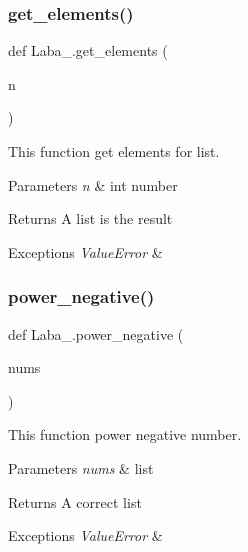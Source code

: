 \subsubsection{\texorpdfstring{get\+\_\+elements()}{get\_elements()}}
{\footnotesize\ttfamily def Laba\+\_.\+get\+\_\+elements (\begin{DoxyParamCaption}\item[{}]{n }\end{DoxyParamCaption})}



This function get elements for list. 


\begin{DoxyParams}{Parameters}
{\em n} & int number \\
\hline
\end{DoxyParams}
\begin{DoxyReturn}{Returns}
A list is the result
\end{DoxyReturn}

\begin{DoxyExceptions}{Exceptions}
{\em Value\+Error} & \\
\hline
\end{DoxyExceptions}
\mbox{\label{namespace_laba__3_abe3ae253298c87454a72df4f5faea91a}} 
\subsubsection{\texorpdfstring{power\+\_\+negative()}{power\_negative()}}
{\footnotesize\ttfamily def Laba\+\_.\+power\+\_\+negative (\begin{DoxyParamCaption}\item[{}]{nums }\end{DoxyParamCaption})}



This function power negative number. 


\begin{DoxyParams}{Parameters}
{\em nums} & list \\
\hline
\end{DoxyParams}
\begin{DoxyReturn}{Returns}
A correct list
\end{DoxyReturn}

\begin{DoxyExceptions}{Exceptions}
{\em Value\+Error} & \\
\hline
\end{DoxyExceptions}


